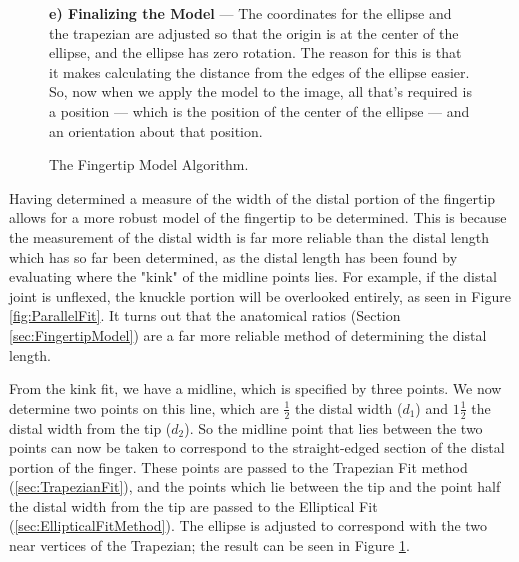 \begin{figure}[p!]
    \begin{minipage}{0.95\textwidth}
         \textbf{e) Finalizing the Model} --- The coordinates for the ellipse and the trapezian are adjusted so that the origin is at the center of the ellipse, and the ellipse has zero rotation. The reason for this is that it makes calculating the distance from the edges of the ellipse easier. So, now when we apply the model to the image, all that's required is a position --- which is the position of the center of the ellipse --- and an orientation about that position. 
    \end{minipage}
    \caption{The Fingertip Model Algorithm.}\label{fig:ModelingFingertip}
\end{figure}

Having determined a measure of the width of the distal portion of the fingertip allows for a more robust model of the fingertip to be determined. This is because the measurement of the distal width is far more reliable than the distal length which has so far been determined, as the distal length has been found by evaluating where the "kink" of the midline points lies. For example, if the distal joint is unflexed, the knuckle portion will be overlooked entirely, as seen in Figure \ref{fig:ParallelFit}. It turns out that the anatomical ratios (Section \ref{sec:FingertipModel}) are a far more reliable method of determining the distal length.

From the kink fit, we have a midline, which is specified by three points. We now determine two points on this line, which are $\frac{1}{2}$ the distal width ($d_1$) and $1\frac{1}{2}$ the distal width from the tip ($d_2$). So the midline point that lies between the two points can now be taken to correspond to the straight-edged section of the distal portion of the finger. These points are passed to the Trapezian Fit method (\ref{sec:TrapezianFit}), and the points which lie between the tip and the point half the distal width from the tip are passed to the Elliptical Fit (\ref{sec:EllipticalFitMethod}). The ellipse is adjusted to correspond with the two near vertices of the Trapezian; the result can be seen in Figure \ref{fig:ModelingFingertip}.

